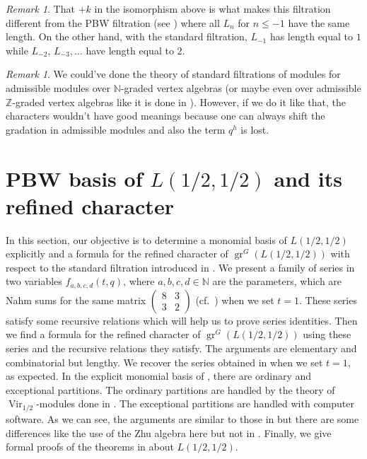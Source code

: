 \documentclass[a4paper, 12pt, reqno]{amsart}
\theoremstyle{remark}
\newtheorem{remark}[theorem]{Remark}
\numberwithin{equation}{subsection}
\DeclareMathOperator{\Vir}{Vir}
\DeclareMathOperator{\gr}{gr}
\begin{document}
\begin{remark}
  \label{rmk:37}
  That $+k$ in the isomorphism above is what makes this filtration different from the PBW filtration (see ) where all $L_n$ for $n \le -1$ have the same length.
  On the other hand, with the standard filtration, $L_{-1}$ has length equal to $1$ while $L_{-2}$, $L_{-3}, \dots$ have length equal to $2$.
\end{remark}

\begin{remark}
  \label{rmk:38}
  We could've done the theory of standard filtrations of modules for admissible modules over $\mathbb{N}$-graded vertex algebras (or maybe even over admissible $\mathbb{Z}$-graded vertex algebras like it is done in \cite{li_vertex_2004}).
  However, if we do it like that, the characters wouldn't have good meanings because one can always shift the gradation in admissible modules and also the term $q^h$ is lost.
\end{remark}

\section{PBW basis of $L(1/2, 1/2)$ and its refined character}
\label{sec:pbw-basis-l12}

In this section, our objective is to determine a monomial basis of $L(1/2, 1/2)$ explicitly and a formula for the refined character of $\gr^G(L(1/2, 1/2))$ with respect to the standard filtration introduced in .
We present a family of series in two variables $f_{a, b, c, d}(t, q)$, where $a, b, c, d \in \mathbb{N}$ are the parameters, which are Nahm sums for the same matrix $\left(\begin{smallmatrix} 8 & 3 \\ 3 & 2 \end{smallmatrix}\right)$ (cf.\ \cite{Nahm2007}) when we set $t = 1$.
These series satisfy some recursive relations which will help us to prove series identities.
Then we find a formula for the refined character of $\gr^G(L(1/2, 1/2))$ using these series and the recursive relations they satisfy.
The arguments are elementary and combinatorial but lengthy.
We recover the series obtained in \cite[Theorem 4]{andrews_singular_2022} when we set $t = 1$, as expected.
In the explicit monomial basis of , there are ordinary and exceptional partitions.
The ordinary partitions are handled by the theory of $\Vir_{1/2}$-modules done in .
The exceptional partitions are handled with computer software.
As we can see, the arguments are similar to those in \cite{andrews_singular_2022} but there are some differences like the use of the Zhu algebra here but not in \cite{andrews_singular_2022}.
Finally, we give formal proofs of the theorems in  about $L(1/2, 1/2)$.
\end{document}
